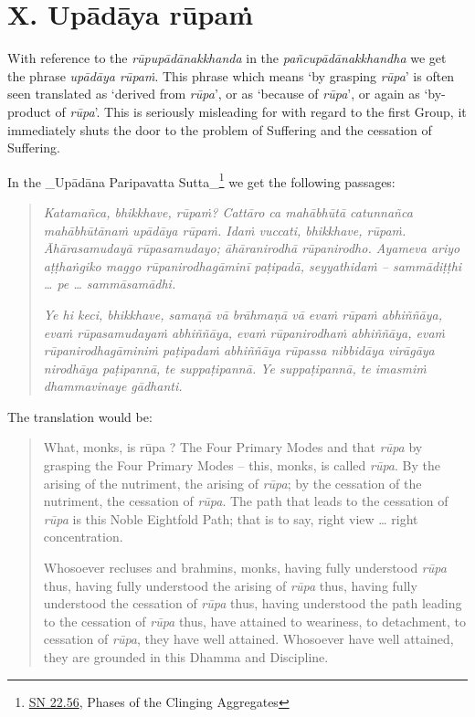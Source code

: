 \hypertarget{_x_upux101dux101ya_rux16bpaux1e41}{%
\section{X. Upādāya rūpaṁ}\label{_x_upux101dux101ya_rux16bpaux1e41}}

With reference to the \textit{rūpupādānakkhanda} in the \textit{pañcupādānakkhandha} we get the phrase \textit{upādāya rūpaṁ}. This phrase which means `by grasping \textit{rūpa}' is often seen translated as `derived from \textit{rūpa}', or as `because of \textit{rūpa}', or again as `by-product of \textit{rūpa}'. This is seriously misleading for with regard to the first Group, it immediately shuts the door to the problem of Suffering and the cessation of Suffering.

In the \_Upādāna Paripavatta Sutta\_\footnote{\href{https://suttacentral.net/sn22.56/en/bodhi}{SN 22.56}, Phases of the Clinging Aggregates} we get the following passages:

\begin{quote}
\textit{Katamañca, bhikkhave, rūpaṁ? Cattāro ca mahābhūtā catunnañca mahābhūtānaṁ upādāya rūpaṁ. Idaṁ vuccati, bhikkhave, rūpaṁ. Āhārasamudayā rūpasamudayo; āhāranirodhā rūpanirodho. Ayameva ariyo aṭṭhaṅgiko maggo rūpanirodhagāminī paṭipadā, seyyathidaṁ -- sammādiṭṭhi \ldots\hspace{0pt} pe \ldots\hspace{0pt} sammāsamādhi.}

\textit{Ye hi keci, bhikkhave, samaṇā vā brāhmaṇā vā evaṁ rūpaṁ abhiññāya, evaṁ rūpasamudayaṁ abhiññāya, evaṁ rūpanirodhaṁ abhiññāya, evaṁ rūpanirodhagāminiṁ paṭipadaṁ abhiññāya rūpassa nibbidāya virāgāya nirodhāya paṭipannā, te suppaṭipannā. Ye suppaṭipannā, te imasmiṁ dhammavinaye gādhanti.}
\end{quote}

The translation would be:

\begin{quote}
What, monks, is rūpa ? The Four Primary Modes and that \textit{rūpa} by grasping the Four Primary Modes -- this, monks, is called \textit{rūpa}. By the arising of the nutriment, the arising of \textit{rūpa}; by the cessation of the nutriment, the cessation of \textit{rūpa}. The path that leads to the cessation of \textit{rūpa} is this Noble Eightfold Path; that is to say, right view \ldots\hspace{0pt} right concentration.

Whosoever recluses and brahmins, monks, having fully understood \textit{rūpa} thus, having fully understood the arising of \textit{rūpa} thus, having fully understood the cessation of \textit{rūpa} thus, having understood the path leading to the cessation of \textit{rūpa} thus, have attained to weariness, to detachment, to cessation of \textit{rūpa}, they have well attained. Whosoever have well attained, they are grounded in this Dhamma and Discipline.
\end{quote}

